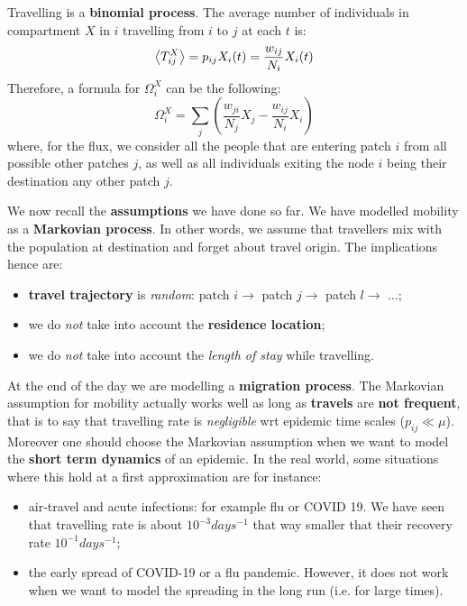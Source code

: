 \documentclass[../main/main.tex]{subfiles}
\begin{document}
Travelling is a \textbf{binomial process}. The average number of individuals in compartment $X$ in $i$ travelling from $i$ to $j$ at each $t$ is:
\begin{equation}
   \expval{T_{ij}^X} = p_{ij} X_i(t) = \frac{w_{ij}}{N_i} X_i(t)
\end{equation}
Therefore, a formula for $\Omega_i^X$ can be the following:
\begin{equation}
    \Omega_i^X = \sum_j \left(\frac{w_{ji}}{N_j} X_j - \frac{w_{ij}}{N_i} X_i  \right)
\end{equation}
where, for the flux, we consider all the people that are entering patch $i$ from all possible other patches $j$, as well as all individuals exiting the node $i$ being their destination any other patch $j$.

We now recall the \textbf{assumptions} we have done so far. We have modelled mobility as a \textbf{Markovian process}. In other words, we assume that travellers mix with the population at destination and forget about travel origin. The implications hence are:
\begin{itemize}
    \item \textbf{travel trajectory} is \textit{random}: patch $i \to$ patch $j \to $ patch $l \to $ ...;
    \item we do \textit{not} take into account the \textbf{residence location};
    \item we do \textit{not} take into account the \textit{length of stay} while travelling.
\end{itemize}
At the end of the day we are modelling a \textbf{migration process}.
The Markovian assumption for mobility actually works well as long as \textbf{travels} are \textbf{not frequent}, that is to say that travelling rate is \textit{negligible} wrt epidemic time scales ($p_{ij} \ll \mu$). Moreover one should choose the Markovian assumption when we want to model the \textbf{short term dynamics} of an epidemic. In the real world, some situations where this hold at a first approximation are for instance:
\begin{itemize}
    \item air-travel and acute infections: for example flu or COVID 19. We have seen that travelling rate is about $10^{-3} days^{-1}$ that way smaller that their recovery rate $10^{-1} days^{-1}$;
    \item the early spread of COVID-19 or a flu pandemic. However, it does not work when we want to model the spreading in the long run (i.e. for large times).
\end{itemize}
\end{document}
